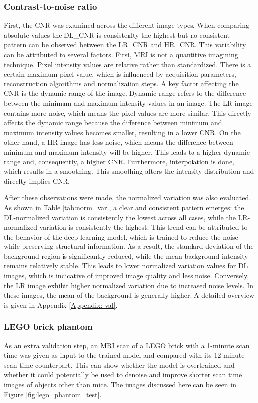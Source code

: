 \documentclass[twocolumn]{article}
\begin{document}
\subsubsection{Contrast-to-noise ratio}
First, the CNR was examined across the different image types. When comparing absolute values the DL\_CNR is consistenlty the highest but no consistent pattern can be observed between the LR\_CNR and HR\_CNR. 
This variability can be attributed to several factors. First, MRI is not a quantitive imagining technique. Pixel intensity values are relative rather than standardized. There is a certain maximum pixel value, which is influenced by acquisition parameters, reconstruction algorithms and normalization steps.
A key factor affecting the CNR is the dynamic range of the image. Dynamic range refers to the difference between the minimum and maximum intensity values in an image.
The LR image contains more noise, which means the pixel values are more similar. This directly affects the dynamic range because the difference between minimum and maximum intensity values becomes smaller, resulting in a lower CNR.
On the other hand, a HR image has less noise, which means the difference between minimum and maximum intensity will be higher. This leads to a higher dynamic range and, consequently, a higher CNR. 
Furthermore, interpolation is done, which results in a smoothing. This smoothing alters the intensity distribution and direclty implies CNR.

After these observations were made, the normalized variation was also evaluated. As shown in Table \ref{tab:norm_var}, a clear and consistent pattern emerges: the DL-normalized variation is consistently the lowest across all cases, while the LR-normalized variation is consistently the highest.
This trend can be attributed to the behavior of the deep learning model, which is trained to reduce the noise while preserving structural information. As a result, the standard deviation of the background region is significantly reduced, while the mean background intensity remains relatively stable.
This leads to lower normalized variation values for DL images, which is indicative of improved image quality and less noise.
Conversely, the LR image exhibit higher normalized variation due to increased noise levels. In these images, the mean of the background is generally higher.
A detailed overview is given in Appendix \ref{Appendix: val}.


\subsubsection{LEGO brick phantom}
As an extra validation step, an MRI scan of a LEGO brick with a 1-minute scan time was given as input to the trained model and compared with its 12-minute scan time counterpart. This can show whether the model is overtrained and whether it could potentially be used to denoise and improve shorter scan time images of objects other than mice. The images discussed here can be seen in Figure \ref{fig:lego_phantom_test}.
\end{document}
